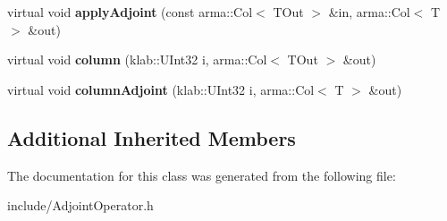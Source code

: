 \begin{DoxyCompactItemize}
\item 
virtual void {\bfseries apply\+Adjoint} (const arma\+::\+Col$<$ T\+Out $>$ \&in, arma\+::\+Col$<$ T $>$ \&out)\hypertarget{classkl1p_1_1TAdjointOperator_ac568d0f9750cb76b6f9993760a360230}{}\label{classkl1p_1_1TAdjointOperator_ac568d0f9750cb76b6f9993760a360230}

\item 
virtual void {\bfseries column} (klab\+::\+U\+Int32 i, arma\+::\+Col$<$ T\+Out $>$ \&out)\hypertarget{classkl1p_1_1TAdjointOperator_a0f7b1596f88594ce81119b3d4e18eda7}{}\label{classkl1p_1_1TAdjointOperator_a0f7b1596f88594ce81119b3d4e18eda7}

\item 
virtual void {\bfseries column\+Adjoint} (klab\+::\+U\+Int32 i, arma\+::\+Col$<$ T $>$ \&out)\hypertarget{classkl1p_1_1TAdjointOperator_af380221ef9538fe31689c6e8b97fabb1}{}\label{classkl1p_1_1TAdjointOperator_af380221ef9538fe31689c6e8b97fabb1}

\end{DoxyCompactItemize}
\subsection*{Additional Inherited Members}


The documentation for this class was generated from the following file\+:\begin{DoxyCompactItemize}
\item 
include/Adjoint\+Operator.\+h\end{DoxyCompactItemize}
